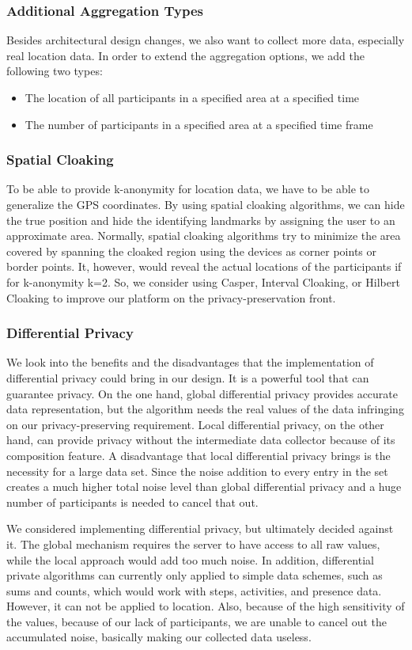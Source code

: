 \subsubsection{Additional Aggregation Types}
Besides architectural design changes, we also want to collect more data, especially real location data. In order to extend the aggregation options, we add the following two types:
\begin{itemize}
    \item The location of all participants in a specified area at a specified time
    \item The number of participants in a specified area at a specified time frame
\end{itemize}

\subsubsection{Spatial Cloaking}
To be able to provide k-anonymity for location data, we have to be able to generalize the GPS coordinates. By using spatial cloaking algorithms, we can hide the true position and hide the identifying landmarks by assigning the user to an approximate area. Normally, spatial cloaking algorithms try to minimize the area covered by spanning the cloaked region using the devices as corner points or border points. It, however, would reveal the actual locations of the participants if for k-anonymity k=2. So, we consider using Casper, Interval Cloaking, or Hilbert Cloaking to improve our platform on the privacy-preservation front. 

\subsubsection{Differential Privacy}
We look into the benefits and the disadvantages that the implementation of differential privacy could bring in our design. It is a powerful tool that can guarantee privacy. On the one hand, global differential privacy provides accurate data representation, but the algorithm needs the real values of the data infringing on our privacy-preserving requirement. Local differential privacy, on the other hand, can provide privacy without the intermediate data collector because of its composition feature. A disadvantage that local differential privacy brings is the necessity for a large data set. Since the noise addition to every entry in the set creates a much higher total noise level than global differential privacy and a huge number of participants is needed to cancel that out.

We considered implementing differential privacy, but ultimately decided against it. The global mechanism requires the server to have access to all raw values, while the local approach would add too much noise. In addition, differential private algorithms can currently only applied to simple data schemes, such as sums and counts, which would work with steps, activities, and presence data. However, it can not be applied to location. Also, because of the high sensitivity of the values, because of our lack of participants, we are unable to cancel out the accumulated noise, basically making our collected data useless.
